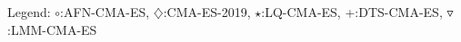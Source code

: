 Legend: {\color{CornflowerBlue}$\circ$}:AFN-CMA-ES, {{}$\diamondsuit$}:CMA-ES-2019, {\color{Green}$\star$}:LQ-CMA-ES, {\color{red}+}:DTS-CMA-ES, {\color{brown}$\triangledown$}:LMM-CMA-ES